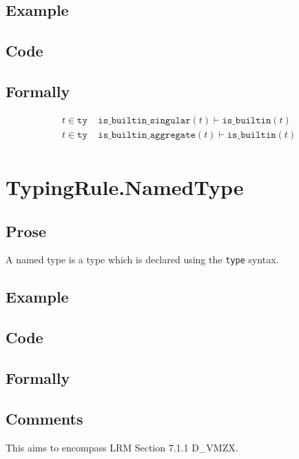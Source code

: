\documentclass{book}
\begin{document}
    \subsection{Example}

    \subsection{Code}

    \subsection{Formally}

     \[
     \begin{array}{l}
     t \in \texttt{ty} \;\;\;\; \texttt{is\_builtin\_singular}(t) \vdash \texttt{is\_builtin}(t)\\
     t \in \texttt{ty} \;\;\;\; \texttt{is\_builtin\_aggregate}(t) \vdash \texttt{is\_builtin}(t)\\
     \end{array}
     \]
   
\section{TypingRule.NamedType \label{sec:TypingRule.NamedType} } 

    \subsection{Prose}
    A named type is a type which is declared using the \texttt{type} syntax.

    \subsection{Example}

    \subsection{Code}

    \subsection{Formally}

    \subsection{Comments}
    This aims to encompass LRM Section 7.1.1 D\_VMZX.
\end{document}
